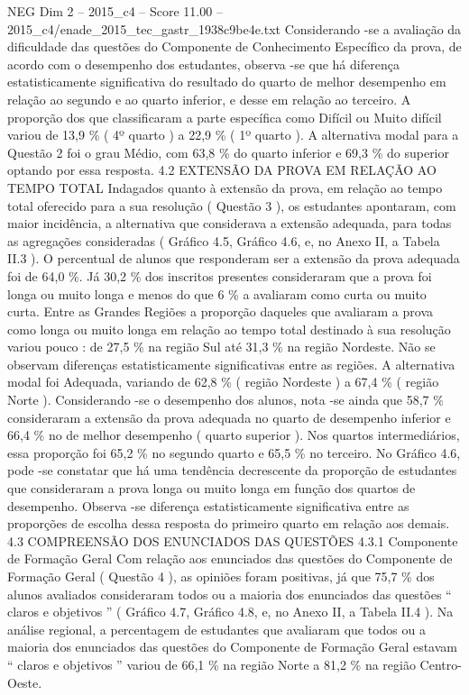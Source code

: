 \begin{textsample}{NEG Dim 2 – 2015\_c4 – Score 11.00 – 2015\_c4/enade\_2015\_tec\_gastr\_1938c9be4e.txt}
Considerando -se a avaliação da dificuldade das questões do Componente de Conhecimento Específico da prova, de acordo com o desempenho dos estudantes, observa -se que há diferença estatisticamente significativa do resultado do quarto de melhor desempenho em relação ao segundo e ao quarto inferior, e desse em relação ao terceiro.
A proporção dos que classificaram a parte específica como Difícil ou Muito difícil variou de 13,9 \% ( 4º quarto ) a 22,9 \% ( 1º quarto ).
A alternativa modal para a Questão 2 foi o grau Médio, com 63,8 \% do quarto inferior e 69,3 \% do superior optando por essa resposta. 4.2 EXTENSÃO DA PROVA EM RELAÇÃO AO TEMPO TOTAL Indagados quanto à extensão da prova, em relação ao tempo total oferecido para a sua resolução ( Questão 3 ), os estudantes apontaram, com maior incidência, a alternativa que considerava a extensão adequada, para todas as agregações consideradas ( Gráfico 4.5, Gráfico 4.6, e, no Anexo II, a Tabela II.3 ).
O percentual de alunos que responderam ser a extensão da prova adequada foi de 64,0 \%.
Já 30,2 \% dos inscritos presentes consideraram que a prova foi longa ou muito longa e menos do que 6 \% a avaliaram como curta ou muito curta.
Entre as Grandes Regiões a proporção daqueles que avaliaram a prova como longa ou muito longa em relação ao tempo total destinado à sua resolução variou pouco : de 27,5 \% na região Sul até 31,3 \% na região Nordeste.
Não se observam diferenças estatisticamente significativas entre as regiões.
A alternativa modal foi Adequada, variando de 62,8 \% ( região Nordeste ) a 67,4 \% ( região Norte ).
Considerando -se o desempenho dos alunos, nota -se ainda que 58,7 \% consideraram a extensão da prova adequada no quarto de desempenho inferior e 66,4 \% no de melhor desempenho ( quarto superior ).
Nos quartos intermediários, essa proporção foi 65,2 \% no segundo quarto e 65,5 \% no terceiro.
No Gráfico 4.6, pode -se constatar que há uma tendência decrescente da proporção de estudantes que consideraram a prova longa ou muito longa em função dos quartos de desempenho.
Observa -se diferença estatisticamente significativa entre as proporções de escolha dessa resposta do primeiro quarto em relação aos demais. 4.3 COMPREENSÃO DOS ENUNCIADOS DAS QUESTÕES 4.3.1 Componente de Formação Geral Com relação aos enunciados das questões do Componente de Formação Geral ( Questão 4 ), as opiniões foram positivas, já que 75,7 \% dos alunos avaliados consideraram todos ou a maioria dos enunciados das questões “ claros e objetivos ” ( Gráfico 4.7, Gráfico 4.8, e, no Anexo II, a Tabela II.4 ).
Na análise regional, a percentagem de estudantes que avaliaram que todos ou a maioria dos enunciados das questões do Componente de Formação Geral estavam “ claros e objetivos ” variou de 66,1 \% na região Norte a 81,2 \% na região Centro-Oeste.

\end{textsample}
